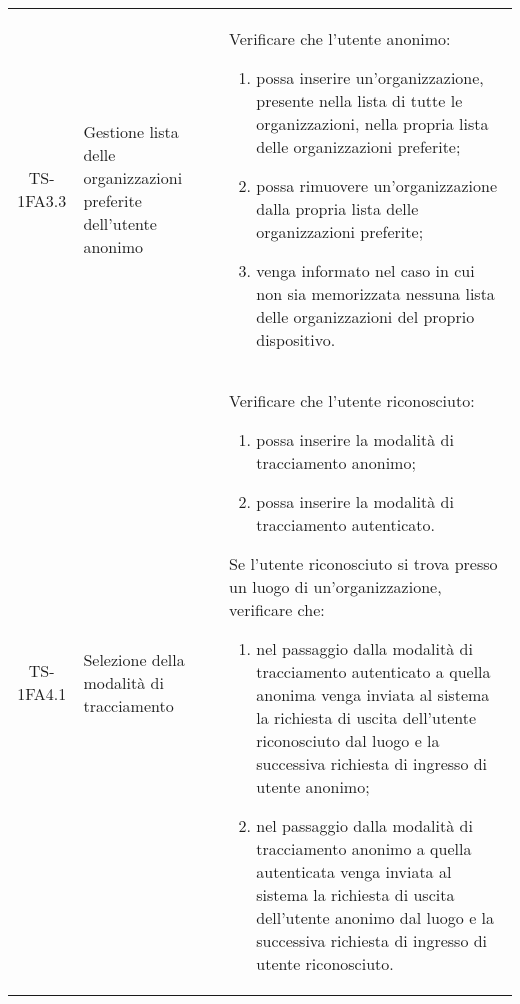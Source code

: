 {\begin{longtable}{ c | C{3cm} | C{11cm} }
TS-1FA3.3 & Gestione lista delle organizzazioni preferite dell'utente anonimo &
Verificare che l'utente anonimo:
\begin{enumerate}
    \item possa inserire un'organizzazione, presente nella lista di tutte le organizzazioni, nella propria lista delle organizzazioni preferite;
    \item possa rimuovere un'organizzazione dalla propria lista delle organizzazioni preferite;
    \item venga informato nel caso in cui non sia memorizzata nessuna lista delle organizzazioni del proprio dispositivo.
\end{enumerate} \\

TS-1FA4.1 & Selezione della modalità di tracciamento & 
Verificare che l'utente riconosciuto:
\begin{enumerate}
    \item possa inserire la modalità di tracciamento anonimo;
    \item possa inserire la modalità di tracciamento autenticato.
\end{enumerate}
Se l'utente riconosciuto si trova presso un luogo di un'organizzazione, verificare che:
\begin{enumerate}
    \item nel passaggio dalla modalità di tracciamento autenticato a quella anonima venga inviata al sistema la richiesta di uscita dell'utente riconosciuto dal luogo e la successiva richiesta di ingresso di utente anonimo;
    \item nel passaggio dalla modalità di tracciamento anonimo a quella autenticata venga inviata al sistema la richiesta di uscita dell'utente anonimo dal luogo e la successiva richiesta di ingresso di utente riconosciuto.
\end{enumerate} \\


\end{longtable}}
